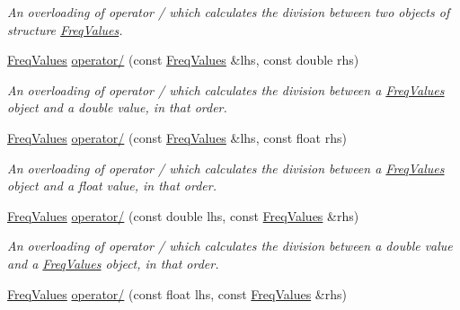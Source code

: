\begin{DoxyCompactItemize}
\begin{DoxyCompactList}\small\item\em An overloading of operator / which calculates the division between two objects of structure {\itshape \hyperlink{structFreqValues}{Freq\+Values}}. \end{DoxyCompactList}\item 
\hyperlink{structFreqValues}{Freq\+Values} \hyperlink{structFreqValues_afa5b83c0e8fbe09dea81891f5062703d}{operator/} (const \hyperlink{structFreqValues}{Freq\+Values} \&lhs, const double rhs)
\begin{DoxyCompactList}\small\item\em An overloading of operator / which calculates the division between a {\itshape \hyperlink{structFreqValues}{Freq\+Values}} object and a {\itshape double} value, in that order. \end{DoxyCompactList}\item 
\mbox{\label{structFreqValues_a392b5ed122a4deafa3ba773f4829c20a}} 
\hyperlink{structFreqValues}{Freq\+Values} \hyperlink{structFreqValues_a392b5ed122a4deafa3ba773f4829c20a}{operator/} (const \hyperlink{structFreqValues}{Freq\+Values} \&lhs, const float rhs)
\begin{DoxyCompactList}\small\item\em An overloading of operator / which calculates the division between a {\itshape \hyperlink{structFreqValues}{Freq\+Values}} object and a {\itshape float} value, in that order. \end{DoxyCompactList}\item 
\hyperlink{structFreqValues}{Freq\+Values} \hyperlink{structFreqValues_a051f343ecd05c5459b26948cfc3160b6}{operator/} (const double lhs, const \hyperlink{structFreqValues}{Freq\+Values} \&rhs)
\begin{DoxyCompactList}\small\item\em An overloading of operator / which calculates the division between a {\itshape double} value and a {\itshape \hyperlink{structFreqValues}{Freq\+Values}} object, in that order. \end{DoxyCompactList}\item 
\mbox{\label{structFreqValues_aed1d809f52aa8f6da3afa2af8a45d288}} 
\hyperlink{structFreqValues}{Freq\+Values} \hyperlink{structFreqValues_aed1d809f52aa8f6da3afa2af8a45d288}{operator/} (const float lhs, const \hyperlink{structFreqValues}{Freq\+Values} \&rhs)

\end{DoxyCompactItemize}
